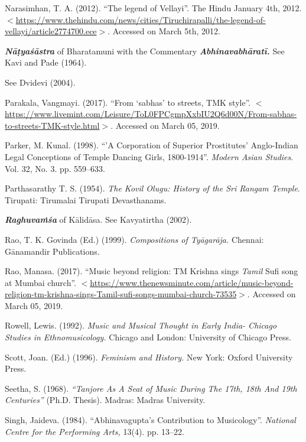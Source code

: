 \begin{thebibliography}{99}
  Narasimhan, T. A. (2012). ``The legend of Vellayi''. The Hindu January 4th, 2012. $<$\url{https://www.thehindu.com/news/cities/Tiruchirapalli/the-legend-of-vellayi/article2774700.ece}$>$. Accessed on March 5th, 2012.

  \textbf{\textit{Nāṭyaśāstra}} of Bharatamuni with the Commentary \textbf{\textit{Abhinavabhāratī.}} See Kavi and Pade (1964).

  See Dvidevi (2004).

  Parakala, Vangmayi. (2017). “From ‘sabhas’ to streets, TMK style”. $<$\url{https://www.livemint.com/Leisure/ToL0FPCgmpXxbIU2Q6d00N/From-sabhas-to-streets-TMK-style.html}$>$. Accessed on March 05, 2019.

  Parker, M. Kunal. (1998). “'A Corporation of Superior Prostitutes' Anglo-Indian Legal Conceptions of Temple Dancing Girls, 1800-1914”. \textit{Modern Asian Studies}. Vol. 32, No. 3. pp. 559--633.

  Parthasarathy T. S. (1954). \textit{The Kovil Olugu: History of the Sri Rangam Temple}. Tirupati: Tirumalai Tirupati Devasthanams.

  \textit{\textbf{Raghuvaṁśa}} of Kālidāsa. See Kavyatirtha (2002).

  Rao, T. K. Govinda (Ed.) (1999). \textit{Compositions of Tyāgarāja. }Chennai: Gānamandir Publications.

  Rao, Manasa. (2017). “Music beyond religion: TM Krishna sings \textit{Tamil} Sufi song at Mumbai church”. $<$\url{https://www.thenewsminute.com/article/music-beyond-religion-tm-krishna-sings-Tamil-sufi-songs-mumbai-church-73535}$>$. Accessed on March 05, 2019.

  Rowell, Lewis. (1992). \textit{Music and Musical Thought in Early India- Chicago Studies in Ethnomusicology.} Chicago and London: University of Chicago Press.

  Scott, Joan. (Ed.) (1996).\textit{ Feminism and History. }New York: Oxford University Press.

  Seetha, S. (1968). \textit{“Tanjore As A Seat of Music During The 17th, 18th And 19th Centuries” }(Ph.D. Thesis). Madras: Madras University.

  Singh, Jaideva. (1984). “Abhinavagupta's Contribution to Musicology”. \textit{National Centre for the Performing Arts, }13(4). pp. 13--22.


\end{thebibliography}
